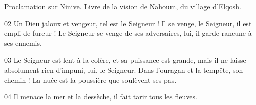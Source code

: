 Proclamation sur Ninive. Livre de la vision de Nahoum, du village d’Elqosh.

02 Un Dieu jaloux et vengeur, tel est le Seigneur ! Il se venge, le Seigneur, il est empli de fureur ! Le Seigneur se venge de ses adversaires, lui, il garde rancune à ses ennemis.

03 Le Seigneur est lent à la colère, et sa puissance est grande, mais il ne laisse absolument rien d’impuni, lui, le Seigneur. Dans l’ouragan et la tempête, son chemin ! La nuée est la poussière que soulèvent ses pas.

04 Il menace la mer et la dessèche, il fait tarir tous les fleuves. 